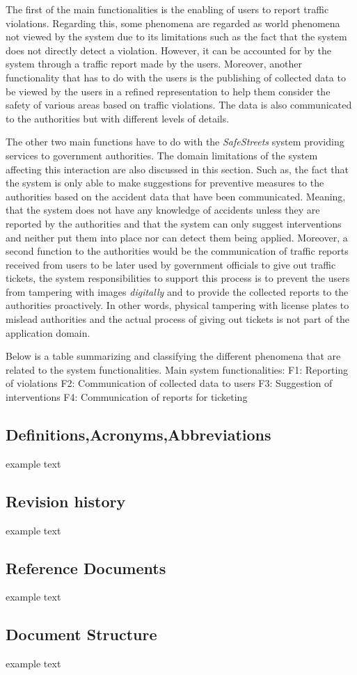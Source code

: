 The first of the main functionalities is the enabling of users to report traffic violations. Regarding this, some phenomena are regarded as world phenomena not viewed by the system due to its limitations such as the fact that the system does not directly detect a violation. However, it can be accounted for by the system through a traffic report made by the users. Moreover, another functionality that has to do with the users is the publishing of collected data to be viewed by the users in a refined representation to help them consider the safety of various areas based on traffic violations. The data is also communicated to the authorities but with different levels of details.

The other two main functions have to do with the \emph{SafeStreets} system providing services to government authorities. The domain limitations of the system affecting this interaction are also discussed in this section. Such as, the fact that the system is only able to make suggestions for preventive measures to the authorities based on the accident data that have been communicated. Meaning, that the system does not have any knowledge of accidents unless they are reported by the authorities and that the system can only suggest interventions and neither put them into place nor can detect them being applied. Moreover, a second function to the authorities would be the communication of traffic reports received from users to be later used by government officials to give out traffic tickets, the system responsibilities to support this process is to prevent the users from tampering with images \emph{digitally} and to provide the collected reports to the authorities proactively. In other words, physical tampering with license plates to mislead authorities and the actual process of giving out tickets is not part of the application domain. 

Below is a table summarizing and classifying the different phenomena that are related to the system functionalities. 
Main system functionalities:
F1: Reporting of violations
F2: Communication of collected data to users
F3: Suggestion of interventions
F4:  Communication of reports for ticketing




\subsection{Definitions,Acronyms,Abbreviations}
	example text


\subsection{Revision history}
	example text


\subsection{Reference Documents}
	example text


\subsection{Document Structure}
	example text


